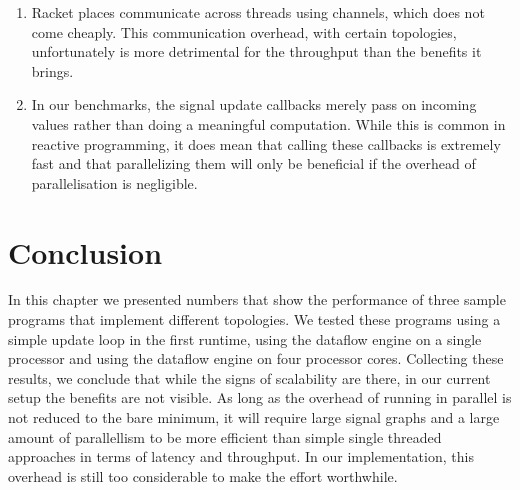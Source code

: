\begin{enumerate}
	\item Racket places communicate across threads using channels, which does not come cheaply. This communication overhead, with certain topologies, unfortunately is more detrimental for the throughput than the benefits it brings. 
	\item In our benchmarks, the signal update callbacks merely pass on incoming values rather than doing a meaningful computation. While this is common in reactive programming, it does mean that calling these callbacks is extremely fast and that parallelizing them will only be beneficial if the overhead of parallelisation is negligible. 
\end{enumerate}

\section{Conclusion}

In this chapter we presented numbers that show the performance of three sample programs that implement different topologies. We tested these programs using a simple update loop in the first runtime, using the dataflow engine on a single processor and using the dataflow engine on four processor cores. Collecting these results, we conclude that while the signs of scalability are there, in our current setup the benefits are not visible. As long as the overhead of running in parallel is not reduced to the bare minimum, it will require large signal graphs and a large amount of parallellism to be more efficient than simple single threaded approaches in terms of latency and throughput. In our implementation, this overhead is still too considerable to make the effort worthwhile. 



